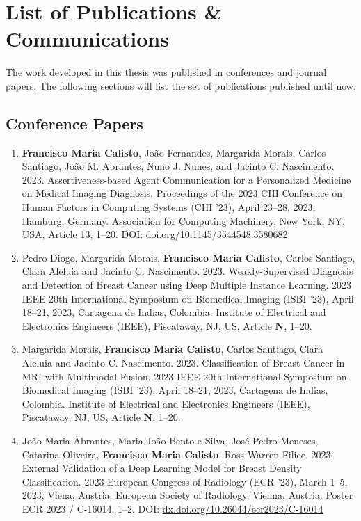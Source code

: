 \section{List of Publications \& Communications}
\label{sec:chap001006}

The work developed in this thesis was published in conferences and journal papers.
The following sections will list the set of publications published until now.

\subsection{Conference Papers}
\label{sec:chap00100601}

\begin{enumerate}
\item {\bf Francisco Maria Calisto}, Jo\~{a}o Fernandes, Margarida Morais, Carlos Santiago, Jo\~{a}o M. Abrantes, Nuno J. Nunes, and Jacinto C. Nascimento. 2023. Assertiveness-based Agent Communication for a Personalized Medicine on Medical Imaging Diagnosis. Proceedings of the 2023 CHI Conference on Human Factors in Computing Systems (CHI '23), April 23--28, 2023, Hamburg, Germany. Association for Computing Machinery, New York, NY, USA, Article 13, 1–20. DOI: \href{https://doi.org/10.1145/3544548.3580682}{doi.org/10.1145/3544548.3580682}
\item Pedro Diogo, Margarida Morais, {\bf Francisco Maria Calisto}, Carlos Santiago, Clara Aleluia and Jacinto C. Nascimento. 2023. Weakly-Supervised Diagnosis and Detection of Breast Cancer using Deep Multiple Instance Learning. 2023 IEEE 20th International Symposium on Biomedical Imaging (ISBI '23), April 18--21, 2023, Cartagena de Indias, Colombia. Institute of Electrical and Electronics Engineers (IEEE), Piscataway, NJ, US, Article {\bf N}, 1–20.
\item Margarida Morais, {\bf Francisco Maria Calisto}, Carlos Santiago, Clara Aleluia and Jacinto C. Nascimento. 2023. Classification of Breast Cancer in MRI with Multimodal Fusion. 2023 IEEE 20th International Symposium on Biomedical Imaging (ISBI '23), April 18--21, 2023, Cartagena de Indias, Colombia. Institute of Electrical and Electronics Engineers (IEEE), Piscataway, NJ, US, Article {\bf N}, 1–20.
\item Jo\~{a}o Maria Abrantes, Maria Jo\~{a}o Bento e Silva, Jos\'{e} Pedro Meneses, Catarina Oliveira, {\bf Francisco Maria Calisto}, Ross Warren Filice. 2023. External Validation of a Deep Learning Model for Breast Density Classification. 2023 European Congress of Radiology (ECR '23), March 1--5, 2023, Viena, Austria. European Society of Radiology, Vienna, Austria. Poster ECR 2023 / C-16014, 1–2. DOI: \href{https://dx.doi.org/10.26044/ecr2023/C-16014}{dx.doi.org/10.26044/ecr2023/C-16014}

\end{enumerate}
